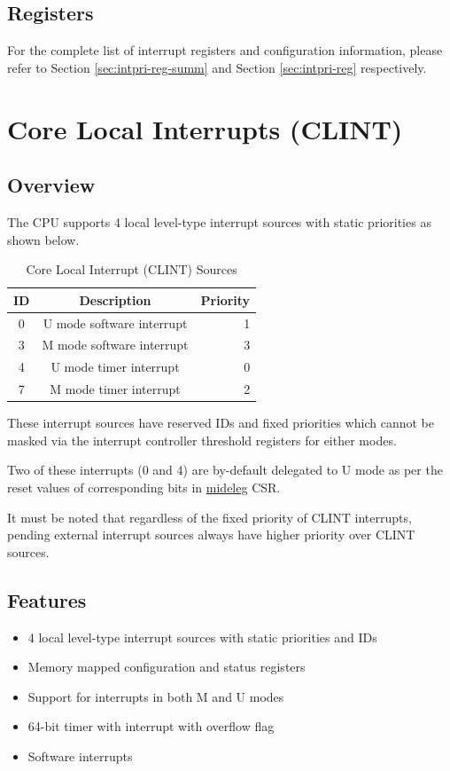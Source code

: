 \documentclass[main\_\_EN.tex]{subfiles}
\begin{document}
\subsection{Registers}
\label{sec:riscvcpu-int-reg-summ}

For the complete list of interrupt registers and configuration information, please refer to Section \ref{sec:intpri-reg-summ} and Section \ref{sec:intpri-reg} respectively.



\clearpage
\section{Core Local Interrupts (CLINT)}
\label{sec:riscvcpu-clint}

\subsection{Overview}
\label{sec:riscvcpu-clint-overview}

The CPU supports 4 local level-type interrupt sources with static priorities as shown below.

\begin{longtable}{ | c | c | r | }
\caption{Core Local Interrupt (CLINT) Sources} \label{tab:riscvcpu-clint-table}
\\ \hline
\rowcolor{lightgray}
ID & Description & Priority \\ \hline
0 & U mode software interrupt & 1 \\ \hline
3 & M mode software interrupt & 3 \\ \hline
4 & U mode timer interrupt & 0 \\ \hline
7 & M mode timer interrupt & 2 \\ \hline
\end{longtable}

These interrupt sources have reserved IDs and fixed priorities which cannot be masked via the interrupt controller threshold registers for either modes.

Two of these interrupts (0 and 4) are by-default delegated to U mode as per the reset values of corresponding bits in \hyperref[regdesc:MIDELEG]{mideleg} CSR.

It must be noted that regardless of the fixed priority of CLINT interrupts, pending external interrupt sources always have higher priority over CLINT sources.

\subsection{Features}
\begin{itemize}
    \item 4 local level-type interrupt sources with static priorities and IDs
    \item Memory mapped configuration and status registers
    \item Support for interrupts in both M and U modes
    \item 64-bit timer with interrupt with overflow flag
    \item Software interrupts
\end{itemize}
\end{document}
